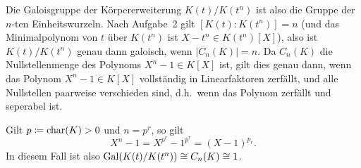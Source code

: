 \documentclass[a4paper,10pt,numbers=noenddot]{scrartcl}
\begin{document}
Die Galoisgruppe der Körpererweiterung $K(t)/K(t^n)$ ist also die Gruppe der $n$-ten Einheitswurzeln.
Nach Aufgabe~2 gilt $[K(t) : K(t^n)] = n$ (und das Minimalpolynom von $t$ über $K(t^n)$ ist $X - t^n \in K(t^n)[X]$),
also ist $K(t)/K(t^n)$ genau dann galoisch, wenn $|C_n(K)| = n$.
Da $C_n(K)$ die Nullstellenmenge des Polynoms $X^n - 1 \in K[X]$ ist, gilt dies genau dann, wenn das Polynom $X^n - 1 \in K[X]$ vollständig in Linearfaktoren zerfällt, und alle Nullstellen paarweise verschieden sind, d.h.\ wenn das Polynom zerfällt und seperabel ist.

Gilt $p \coloneqq \operatorname{char}(K) > 0$ und $n = p^r$, so gilt
\[
    X^n - 1
  = X^{p^r} - 1^{p^r}
  = (X - 1)^{p_r}.
\]
In diesem Fall ist also $\operatorname{Gal}(K(t) / K(t^n)) \cong C_n(K) \cong 1$.
\end{document}
